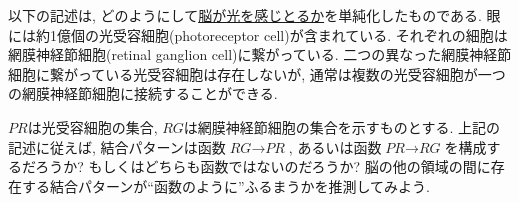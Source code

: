 \begin{exercise}


以下の記述は, どのようにして\href{http://en.wikipedia.org/wiki/Retina}{脳が光を感じとるか}を単純化したものである. 眼には約1億個の光受容細胞(photoreceptor cell)が含まれている. それぞれの細胞は網膜神経節細胞(retinal ganglion cell)に繋がっている. 二つの異なった網膜神経節細胞に繋がっている光受容細胞は存在しないが, 通常は複数の光受容細胞が一つの網膜神経節細胞に接続することができる.


$\mathit{PR}$は光受容細胞の集合, $\textit{RG}$は網膜神経節細胞の集合を示すものとする.
\sexc 上記の記述に従えば, 結合パターンは函数$\textit{RG}\to \textit{PR}$, あるいは函数$\textit{PR}\to \textit{RG}$を構成するだろうか? もしくはどちらも函数ではないのだろうか?
\next 脳の他の領域の間に存在する結合パターンが``函数のように''ふるまうかを推測してみよう.
\endsexc
\end{exercise}

